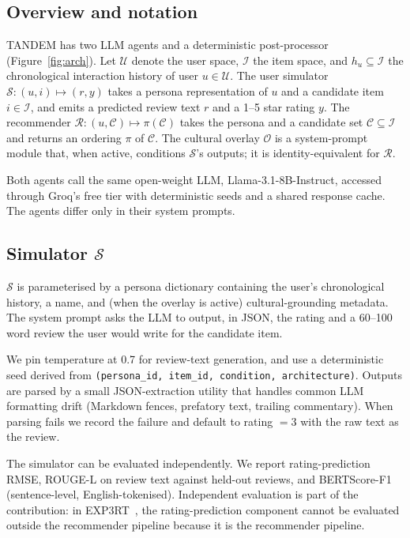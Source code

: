\documentclass[8pt,twocolumn,a4paper]{extarticle}
\begin{document}
\subsection{Overview and notation}
\label{sec:method:overview}

TANDEM has two LLM agents and a deterministic post-processor (Figure~\ref{fig:arch}). Let $\mathcal{U}$ denote the user space, $\mathcal{I}$ the item space, and $h_u \subseteq \mathcal{I}$ the chronological interaction history of user $u \in \mathcal{U}$. The user simulator $\mathcal{S} : (u, i) \mapsto (r, y)$ takes a persona representation of $u$ and a candidate item $i \in \mathcal{I}$, and emits a predicted review text $r$ and a 1--5 star rating $y$. The recommender $\mathcal{R} : (u, \mathcal{C}) \mapsto \pi(\mathcal{C})$ takes the persona and a candidate set $\mathcal{C} \subseteq \mathcal{I}$ and returns an ordering $\pi$ of $\mathcal{C}$. The cultural overlay $\mathcal{O}$ is a system-prompt module that, when active, conditions $\mathcal{S}$'s outputs; it is identity-equivalent for $\mathcal{R}$.

Both agents call the same open-weight LLM, Llama-3.1-8B-Instruct, accessed through Groq's free tier with deterministic seeds and a shared response cache. The agents differ only in their system prompts.

\subsection{Simulator $\mathcal{S}$}
\label{sec:method:sim}

$\mathcal{S}$ is parameterised by a persona dictionary containing the user's chronological history, a name, and (when the overlay is active) cultural-grounding metadata. The system prompt asks the LLM to output, in JSON, the rating and a 60--100 word review the user would write for the candidate item.

We pin temperature at 0.7 for review-text generation, and use a deterministic seed derived from \texttt{(persona\_id, item\_id, condition, architecture)}. Outputs are parsed by a small JSON-extraction utility that handles common LLM formatting drift (Markdown fences, prefatory text, trailing commentary). When parsing fails we record the failure and default to rating $= 3$ with the raw text as the review.

The simulator can be evaluated independently. We report rating-prediction RMSE, ROUGE-L on review text against held-out reviews, and BERTScore-F1 (sentence-level, English-tokenised). Independent evaluation is part of the contribution: in EXP3RT~\citep{kim2025exp3rt}, the rating-prediction component cannot be evaluated outside the recommender pipeline because it is the recommender pipeline.
\end{document}
